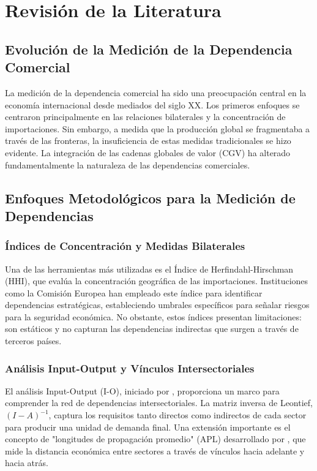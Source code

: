 \documentclass[final,1p,times,authoryear]{elsarticle}
\begin{document}
\section{Revisión de la Literatura}

\subsection{Evolución de la Medición de la Dependencia Comercial}
La medición de la dependencia comercial ha sido una preocupación central en la economía internacional desde mediados del siglo XX. Los primeros enfoques se centraron principalmente en las relaciones bilaterales y la concentración de importaciones. Sin embargo, a medida que la producción global se fragmentaba a través de las fronteras, la insuficiencia de estas medidas tradicionales se hizo evidente. La integración de las cadenas globales de valor (CGV) ha alterado fundamentalmente la naturaleza de las dependencias comerciales.

\subsection{Enfoques Metodológicos para la Medición de Dependencias}
\subsubsection{Índices de Concentración y Medidas Bilaterales}
Una de las herramientas más utilizadas es el Índice de Herfindahl-Hirschman (HHI), que evalúa la concentración geográfica de las importaciones. Instituciones como la Comisión Europea han empleado este índice para identificar dependencias estratégicas, estableciendo umbrales específicos para señalar riesgos para la seguridad económica. No obstante, estos índices presentan limitaciones: son estáticos y no capturan las dependencias indirectas que surgen a través de terceros países.

\subsubsection{Análisis Input-Output y Vínculos Intersectoriales}
El análisis Input-Output (I-O), iniciado por \cite{Leontief1951}, proporciona un marco para comprender la red de dependencias intersectoriales. La matriz inversa de Leontief, $(I - A)^{-1}$, captura los requisitos tanto directos como indirectos de cada sector para producir una unidad de demanda final. Una extensión importante es el concepto de "longitudes de propagación promedio" (APL) desarrollado por \cite{Dietzenbacher2005}, que mide la distancia económica entre sectores a través de vínculos hacia adelante y hacia atrás.
\end{document}
